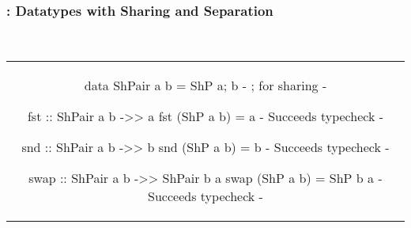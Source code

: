 

\begin{frame}[fragile, c]
  \frametitle{\qub{}: Datatypes with Sharing and Separation}
  \begin{center}
    \\

    \begin{tabular}[c]{c}
           \begin{haskell}
data ShPair a b = ShP a; b     {- ; for sharing -}

fst :: ShPair a b ->> a
fst (ShP a b) = a              {- Succeeds typecheck -}

snd :: ShPair a b ->> b
snd (ShP a b) = b              {- Succeeds typecheck -}

swap :: ShPair a b ->> ShPair b a
swap (ShP a b) = ShP b a       {- Succeeds typecheck -}
          \end{haskell}
        \end{tabular}
  \end{center}
\end{frame}

